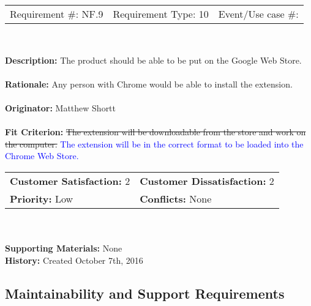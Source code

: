 \documentclass[12pt, titlepage]{article}
\begin{document}
\begin{framed}
	
	\begin{center}
		
		\begin{tabular}{ l c r }
			Requirement \#: NF.9 & Requirement Type: 10 & Event/Use case \#: \\
		\end{tabular} \\
	\end{center}
	\textbf{Description:} The product should be able to be put on the Google 
	Web Store.\\
	\\
	\textbf{Rationale:} Any person with Chrome would be able to install the extension.  \\
	\\
	\textbf{Originator:} Matthew Shortt \\
	\\
	\textbf{Fit Criterion:} \sout{The extension will be downloadable from the 
	store and work on the computer. } \textcolor{blue}{The extension will be in 
	the correct format to be loaded into the Chrome Web Store.}
	\\
	
	\begin{tabular}{ll}
		\textbf{Customer Satisfaction:} 2 & \textbf{Customer Dissatisfaction:} 2 \\
		\textbf{Priority:} Low & \textbf{Conflicts:} None\\
	\end{tabular} \\
	\\
	\textbf{Supporting Materials:} None \\
	\textbf{History:} Created October 7th, 2016
	
\end{framed}

\subsection{Maintainability and Support Requirements}
\end{document}
